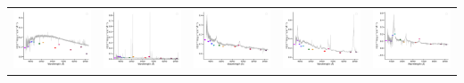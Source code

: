 \begin{center}
\begin{longtable}{l l l l l }
    \includegraphics[width=0.19\linewidth, clip]{Figs/Figs-sdss/spec-9144-57666-0046-SPLUS-s02s04-008782.pdf} & \includegraphics[width=0.19\linewidth, clip]{Figs/Figs-sdss/spec-9144-57666-0109-STRIPE82-0127-008619.pdf} & \includegraphics[width=0.19\linewidth, clip]{Figs/Figs-sdss/spec-9145-58041-0210-SPLUS-s02s05-026507.pdf} & \includegraphics[width=0.19\linewidth, clip]{Figs/Figs-sdss/spec-9146-58042-0345-SPLUS-s02s07-034127.pdf} & \includegraphics[width=0.19\linewidth, clip]{Figs/Figs-sdss/spec-9146-58042-0510-STRIPE82-0131-050516.pdf} \\

\end{longtable}
\end{center}
